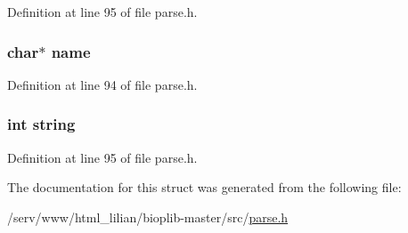 Definition at line 95 of file parse.\-h.

\hypertarget{struct_m_key_wd_a5ac083a645d964373f022d03df4849c8}{
\subsubsection[{name}]{\setlength{\rightskip}{0pt plus 5cm}char$\ast$ name}}\label{struct_m_key_wd_a5ac083a645d964373f022d03df4849c8}


Definition at line 94 of file parse.\-h.

\hypertarget{struct_m_key_wd_a6173b7d8f1e6927813745d72ea5bed19}{
\subsubsection[{string}]{\setlength{\rightskip}{0pt plus 5cm}int string}}\label{struct_m_key_wd_a6173b7d8f1e6927813745d72ea5bed19}


Definition at line 95 of file parse.\-h.



The documentation for this struct was generated from the following file\-:\begin{DoxyCompactItemize}
\item 
/serv/www/html\-\_\-lilian/bioplib-\/master/src/\hyperlink{parse_8h}{parse.\-h}\end{DoxyCompactItemize}

